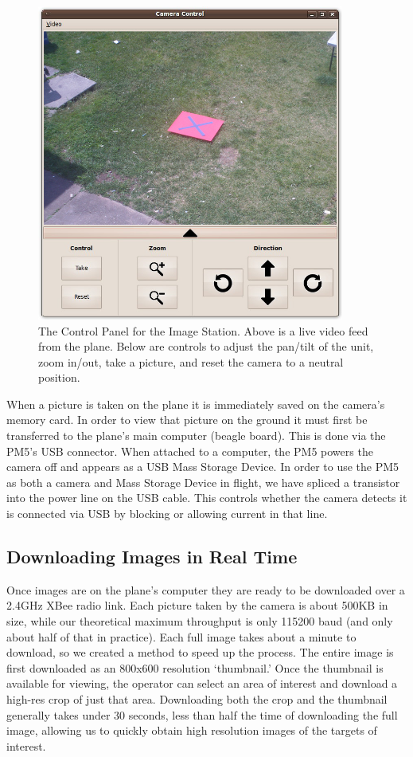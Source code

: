\documentclass[10pt]{report}
\begin{document}
\begin{figure} [H]
  \centering
  	\includegraphics[width=0.9\textwidth]{../images/ImageStationControls.jpg}
  	\caption[Image Station Control Panel]{The Control Panel for the Image Station.  Above is a live video feed from the plane.  Below are controls to adjust the pan/tilt of the unit, zoom in/out, take a picture, and reset the camera to a neutral position.}
  	\label{fig:imagestationcontrols}
\end{figure}

When a picture is taken on the plane it is immediately saved on the camera's memory card.  In order to view that picture on the ground it must first be transferred to the plane's main computer (beagle board).  This is done via the PM5's USB connector.  When attached to a computer, the PM5 powers the camera off and appears as a USB Mass Storage Device. In order to use the PM5 as both a camera and Mass Storage Device in flight, we have spliced a transistor into the power line on the USB cable. This controls whether the camera detects it is connected via USB by blocking or allowing current in that line.

\subsection{Downloading Images in Real Time}

Once images are on the plane's computer they are ready to be downloaded over a 2.4GHz XBee radio link.  Each picture taken by the camera is about 500KB in size, while our theoretical maximum throughput is only 115200 baud (and only about half of that in practice).  Each full image takes about a minute to download, so we created a method to speed up the process.  The entire image is first downloaded as an 800x600 resolution `thumbnail.'  Once the thumbnail is available for viewing, the operator can select an area of interest and download a high-res crop of just that area.  Downloading both the crop and the thumbnail generally takes under 30 seconds, less than half the time of downloading the full image, allowing us to quickly obtain high resolution images of the targets of interest.
\end{document}
